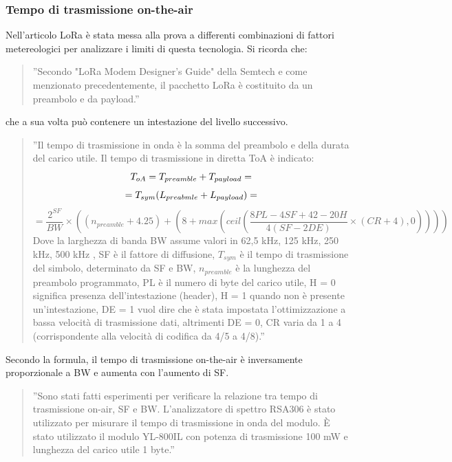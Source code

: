 \documentclass[a4paper]{report} %
\begin{document}
\subsubsection{Tempo di trasmissione on-the-air}
Nell'articolo \cite{art:rif.44} LoRa è stata messa alla prova a differenti combinazioni di fattori metereologici per analizzare i limiti di questa tecnologia. Si ricorda che:
\begin{quote}
	''Secondo "LoRa Modem Designer’s Guide" della Semtech e come menzionato precedentemente, il pacchetto LoRa è costituito da un preambolo e da payload.'' 
\end{quote}
che a sua volta può contenere un intestazione del livello successivo.
\begin{quote} 
	''Il tempo di trasmissione in onda è la somma del preambolo e della durata del carico utile. Il tempo di trasmissione in diretta ToA è indicato:
\begin{equation}
T_{oA} = T_{preamble} + T_{payload} = \\
\end{equation}
\begin{equation}
= T_{sym}(L_{preabmle}+L_{payload}) = \\
\end{equation}
\begin{equation}
= \frac{2^{SF}}{BW}\times((n_{preamble}+4.25)+(8+max(ceil(\frac{8PL-4SF+42-20H}{4(SF-2DE)}\times(CR+4),0))))
\end{equation}
	Dove la larghezza di banda BW assume valori in {62,5 kHz, 125 kHz, 250 kHz, 500 kHz }, SF è il fattore di diffusione, $T_{sym}$ è il tempo di trasmissione del simbolo, determinato da SF e BW, $n_{preamble}$ è la lunghezza del preambolo programmato, PL è il numero di byte del carico utile, H = 0 significa presenza dell'intestazione (header), H = 1 quando non è presente un'intestazione, DE = 1 vuol dire che è stata impostata l'ottimizzazione a bassa velocità di trasmissione dati, altrimenti DE = 0, CR varia da 1 a 4 (corrispondente alla velocità di codifica da 4/5 a 4/8).'' 
\end{quote}	
Secondo la formula, il tempo di trasmissione on-the-air è inversamente proporzionale a BW e aumenta con l'aumento di SF. 
\cite{art:rif.44}
\begin{quote}
	''Sono stati fatti esperimenti per verificare la relazione tra tempo di trasmissione on-air, SF e BW. L'analizzatore di spettro RSA306 è stato utilizzato per misurare il tempo di trasmissione in onda del modulo. È stato utilizzato il modulo YL-800IL con potenza di trasmissione 100 mW e lunghezza del carico utile 1 byte.'' 
\end{quote}
\end{document}
